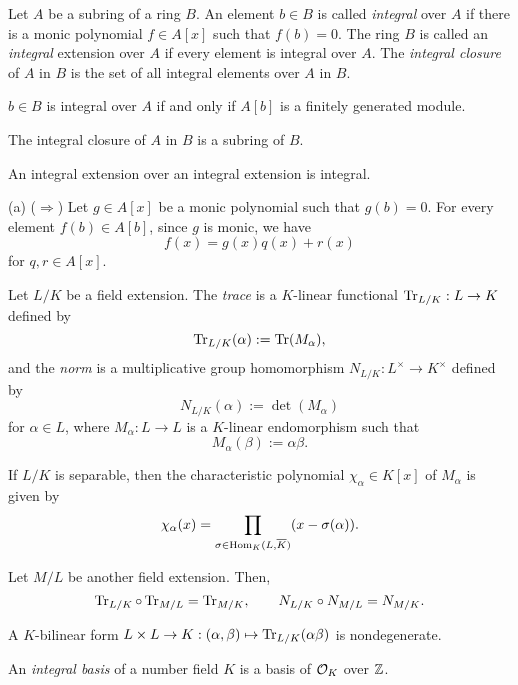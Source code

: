 \documentclass{../../large}
\begin{document}
\begin{prb}
Let $A$ be a subring of a ring $B$.
An element $b\in B$ is called \emph{integral} over $A$ if there is a monic polynomial $f\in A[x]$ such that $f(b)=0$.
The ring $B$ is called an \emph{integral} extension over $A$ if every element is integral over $A$.
The \emph{integral closure} of $A$ in $B$ is the set of all integral elements over $A$ in $B$.
\begin{parts}
\item $b\in B$ is integral over $A$ if and only if $A[b]$ is a finitely generated module.
\item The integral closure of $A$ in $B$ is a subring of $B$.
\item An integral extension over an integral extension is integral.
\end{parts}
\end{prb}
\begin{pf}
(a)
($\Rightarrow$)
Let $g\in A[x]$ be a monic polynomial such that $g(b)=0$.
For every element $f(b)\in A[b]$, since $g$ is monic, we have
\[f(x)=g(x)q(x)+r(x)\]
for $q,r\in A[x]$.
\end{pf}


\begin{prb}
Let $L/K$ be a field extension.
The \emph{trace} is a $K$-linear functional $\operatorname{Tr}_{L/K}:L\to K$ defined by
\[\operatorname{Tr}_{L/K}(\alpha):=\operatorname{Tr}(M_\alpha),\]
and the \emph{norm} is a multiplicative group homomorphism $N_{L/K}:L^\times\to K^\times$ defined by
\[N_{L/K}(\alpha):=\det(M_\alpha)\]
for $\alpha\in L$, where $M_\alpha:L\to L$ is a $K$-linear endomorphism such that
\[M_\alpha(\beta):=\alpha\beta.\]
\begin{parts}
\item If $L/K$ is separable, then the characteristic polynomial $\chi_\alpha\in K[x]$ of $M_\alpha$ is given by
\[\chi_\alpha(x)=\prod_{\sigma\in\operatorname{Hom}_K(L,\overline K)}(x-\sigma(\alpha)).\]
\item Let $M/L$ be another field extension. Then,
\[\operatorname{Tr}_{L/K}\circ\operatorname{Tr}_{M/L}=\operatorname{Tr}_{M/K},\qquad N_{L/K}\circ N_{M/L}=N_{M/K}.\]
\item A $K$-bilinear form $L\times L\to K:(\alpha,\beta)\mapsto\operatorname{Tr}_{L/K}(\alpha\beta)$ is nondegenerate.
\end{parts}
\end{prb}

\begin{prb}
An \emph{integral basis} of a number field $K$ is a basis of $\mathcal{O}_K$ over $\mathbb{Z}$.
\end{prb}
\end{document}
